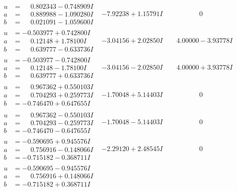 \documentclass[1p]{elsarticle_modified}
\theoremstyle{definition}
\begin{document}
$$\begin{array}{c|c|c}
\begin{aligned}
u &= \phantom{-}0.802343 - 0.748909 I \\
a &= \phantom{-}0.889988 - 1.090280 I \\
b &= \phantom{-}0.021091 - 1.059600 I\end{aligned}
 & -7.92238 + 1.15791 I & \phantom{-0.000000 } 0 \\ \hline\begin{aligned}
u &= -0.503977 + 0.742800 I \\
a &= \phantom{-}0.12148 + 1.78100 I \\
b &= \phantom{-}0.639777 - 0.633736 I\end{aligned}
 & -3.04156 + 2.02850 I & \phantom{-}4.00000 - 3.93778 I \\ \hline\begin{aligned}
u &= -0.503977 - 0.742800 I \\
a &= \phantom{-}0.12148 - 1.78100 I \\
b &= \phantom{-}0.639777 + 0.633736 I\end{aligned}
 & -3.04156 - 2.02850 I & \phantom{-}4.00000 + 3.93778 I \\ \hline\begin{aligned}
u &= \phantom{-}0.967362 + 0.550103 I \\
a &= \phantom{-}0.704293 + 0.259773 I \\
b &= -0.746470 + 0.647655 I\end{aligned}
 & -1.70048 + 5.14403 I & \phantom{-0.000000 } 0 \\ \hline\begin{aligned}
u &= \phantom{-}0.967362 - 0.550103 I \\
a &= \phantom{-}0.704293 - 0.259773 I \\
b &= -0.746470 - 0.647655 I\end{aligned}
 & -1.70048 - 5.14403 I & \phantom{-0.000000 } 0 \\ \hline\begin{aligned}
u &= -0.590695 + 0.945576 I \\
a &= \phantom{-}0.756916 - 0.148066 I \\
b &= -0.715182 - 0.368711 I\end{aligned}
 & -2.29120 + 2.48545 I & \phantom{-0.000000 } 0 \\ \hline\begin{aligned}
u &= -0.590695 - 0.945576 I \\
a &= \phantom{-}0.756916 + 0.148066 I \\
b &= -0.715182 + 0.368711 I\end{aligned}

\end{array}$$
\end{document}
